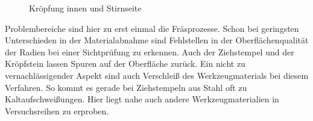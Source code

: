 \documentclass[12pt,a4paper,parskip]{scrartcl}
\begin{document}
\begin{figure}[!htb]
\centering
\hfill
{}
\hfill
{}
\hfill
\caption{Kröpfung innen und Stirnseite }
\label{fig:kropfinstirn}
\end{figure}


 
Problembereiche sind hier zu erst einmal die Fräsprozesse. Schon bei geringsten Unterschieden in der Materialabnahme sind Fehlstellen in der Oberflächenqualität der Radien bei einer Sichtprüfung zu erkennen. Auch der Ziehstempel und der Kröpfstein lassen Spuren auf der Oberfläche zurück. Ein nicht zu vernachlässigender Aspekt sind auch Verschleiß des Werkzeugmaterials bei diesem Verfahren. So kommt es gerade bei Ziehstempeln aus Stahl oft zu Kaltaufschweißungen. Hier liegt nahe auch andere Werkzeugmaterialien in Versuchsreihen zu erproben.
\medskip
\end{document}
